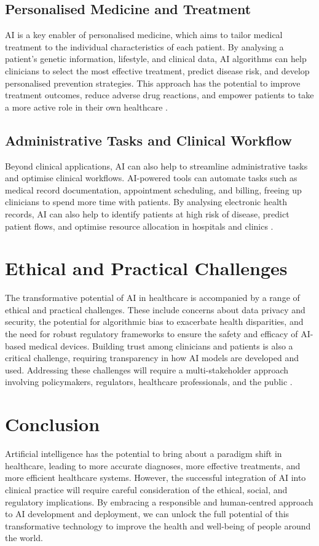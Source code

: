 \subsection{Personalised Medicine and Treatment}

AI is a key enabler of personalised medicine, which aims to tailor medical treatment to the individual characteristics of each patient. By analysing a patient's genetic information, lifestyle, and clinical data, AI algorithms can help clinicians to select the most effective treatment, predict disease risk, and develop personalised prevention strategies. This approach has the potential to improve treatment outcomes, reduce adverse drug reactions, and empower patients to take a more active role in their own healthcare \parencite{jiang2017artificial}.

\subsection{Administrative Tasks and Clinical Workflow}

Beyond clinical applications, AI can also help to streamline administrative tasks and optimise clinical workflows. AI-powered tools can automate tasks such as medical record documentation, appointment scheduling, and billing, freeing up clinicians to spend more time with patients. By analysing electronic health records, AI can also help to identify patients at high risk of disease, predict patient flows, and optimise resource allocation in hospitals and clinics \parencite{mintz2019introduction}.

\section{Ethical and Practical Challenges}

The transformative potential of AI in healthcare is accompanied by a range of ethical and practical challenges. These include concerns about data privacy and security, the potential for algorithmic bias to exacerbate health disparities, and the need for robust regulatory frameworks to ensure the safety and efficacy of AI-based medical devices. Building trust among clinicians and patients is also a critical challenge, requiring transparency in how AI models are developed and used. Addressing these challenges will require a multi-stakeholder approach involving policymakers, regulators, healthcare professionals, and the public \parencite{australian2025safe}.

\section{Conclusion}

Artificial intelligence has the potential to bring about a paradigm shift in healthcare, leading to more accurate diagnoses, more effective treatments, and more efficient healthcare systems. However, the successful integration of AI into clinical practice will require careful consideration of the ethical, social, and regulatory implications. By embracing a responsible and human-centred approach to AI development and deployment, we can unlock the full potential of this transformative technology to improve the health and well-being of people around the world.
